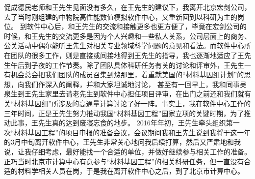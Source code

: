 促成德民老师和王先生见面没有多久，在王先生的建议下，我离开北京宏剑公司，去了当时刚组建的中物院高性能数值模拟软件中心，又重新回到以科研为主的岗位。%
到软件中心后，和王先生的交流和接触更多也更方便了，毕竟在宏剑公司的时候，和王先生的交流更多是因为个人兴趣和一些私人关系，公司层面上的商务、公关活动中偶尔能听王先生对相关专业领域科学问题的意见和看法。而软件中心所在团队的很多工作，则是直接或间接地得到王先生的指导，我也逐渐地适应了王先生午后到子夜的工作节奏。除了团队具体科研任务有关的讨论和评审外，王先生一有机会总会把我们团队的成员召集到怹那里，着重就美国的``材料基因组计划''的思想，向我们作深入的阐释，并和大家坦诚地讨论，%
甚至有一回早上，我和同事吴泉生到王先生家里去请老先生到软件中心担任项目评审，在出门之前还和我们就有关``材料基因组''所涉及的高通量计算讨论了好一阵。事实上，我在软件中心工作的三年时间，正是王先生努力推动我国``材料基因工程''国家立项的关键时期，为了推动此事，王先生真的达到废寝忘食的地步。%
2016年年初，王先生牵头组织第一次``材料基因工程''的项目申报的准备会议，会议期间我和王先生说到我将于这一年的3月中旬离开软件中心，王先生非常关心地问我后续打算，然后又严肃地和我说，让我仔细考虑，最好能找一个合适的单位，并做好继续参与相关工作的准备。正巧当时北京市计算中心有意参与``材料基因工程''的相关科研任务，但一直没有合适的材料学相关人员在岗，于是我在离开软件中心之后，到了北京市计算中心。

